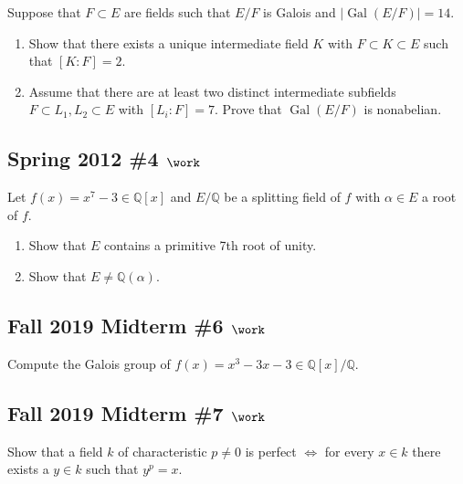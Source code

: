 Suppose that \(F\subset E\) are fields such that \(E/F\) is Galois and
\({\left\lvert {\operatorname{Gal}(E/F)} \right\rvert} = 14\).

\begin{enumerate}
\def\labelenumi{\alph{enumi}.}
\item
  Show that there exists a unique intermediate field \(K\) with
  \(F\subset K \subset E\) such that \([K: F] = 2\).
\item
  Assume that there are at least two distinct intermediate subfields
  \(F \subset L_1, L_2 \subset E\) with \([L_i: F]= 7\). Prove that
  \(\operatorname{Gal}(E/F)\) is nonabelian.
\end{enumerate}

\hypertarget{spring-2012-4-work}{%
\subsection{\texorpdfstring{Spring 2012 \#4
\(\work\)}{Spring 2012 \#4 \textbackslash work}}\label{spring-2012-4-work}}

Let \(f(x) = x^7 - 3\in {\mathbb{Q}}[x]\) and \(E/{\mathbb{Q}}\) be a
splitting field of \(f\) with \(\alpha \in E\) a root of \(f\).

\begin{enumerate}
\def\labelenumi{\alph{enumi}.}
\item
  Show that \(E\) contains a primitive 7th root of unity.
\item
  Show that \(E\neq {\mathbb{Q}}(\alpha)\).
\end{enumerate}

\hypertarget{fall-2019-midterm-6-work}{%
\subsection{\texorpdfstring{Fall 2019 Midterm \#6
\(\work\)}{Fall 2019 Midterm \#6 \textbackslash work}}\label{fall-2019-midterm-6-work}}

Compute the Galois group of
\(f(x) = x^3-3x -3\in {\mathbb{Q}}[x]/{\mathbb{Q}}\).

\hypertarget{fall-2019-midterm-7-work}{%
\subsection{\texorpdfstring{Fall 2019 Midterm \#7
\(\work\)}{Fall 2019 Midterm \#7 \textbackslash work}}\label{fall-2019-midterm-7-work}}

Show that a field \(k\) of characteristic \(p\neq 0\) is perfect
\(\iff\) for every \(x\in k\) there exists a \(y\in k\) such that
\(y^p=x\).

